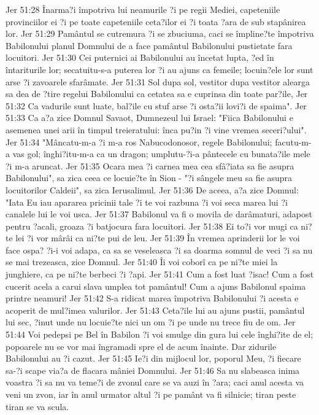 Jer 51:28  Înarma?i împotriva lui neamurile ?i pe regii Mediei, capeteniile provinciilor ei ?i pe toate capeteniile ceta?ilor ei ?i toata ?ara de sub stapânirea lor.
Jer 51:29  Pamântul se cutremura ?i se zbuciuma, caci se împline?te împotriva Babilonului planul Domnului de a face pamântul Babilonului pustietate fara locuitori.
Jer 51:30  Cei puternici ai Babilonului au încetat lupta, ?ed în întariturile lor; secatuitu-s-a puterea lor ?i au ajuns ca femeile; locuin?ele lor sunt arse ?i zavoarele sfarâmate.
Jer 51:31  Sol dupa sol, vestitor dupa vestitor alearga sa dea de ?tire regelui Babilonului ca cetatea sa e cuprinsa din toate par?ile,
Jer 51:32  Ca vadurile sunt luate, bal?ile cu stuf arse ?i osta?ii lovi?i de spaima".
Jer 51:33  Ca a?a zice Domnul Savaot, Dumnezeul lui Israel: "Fiica Babilonului e asemenea unei arii în timpul treieratului: înca pu?in ?i vine vremea seceri?ului".
Jer 51:34  "Mâncatu-m-a ?i m-a ros Nabucodonosor, regele Babilonului; facutu-m-a vas gol; înghi?itu-m-a ca un dragon; umplutu-?i-a pântecele cu bunata?ile mele ?i m-a aruncat.
Jer 51:35  Ocara mea ?i carnea mea cea sfâ?iata sa fie asupra Babilonului", sa zica ceea ce locuie?te în Sion - "?i sângele meu sa fie asupra locuitorilor Caldeii", sa zica Ierusalimul.
Jer 51:36  De aceea, a?a zice Domnul: "Iata Eu iau apararea pricinii tale ?i te voi razbuna ?i voi seca marea lui ?i canalele lui le voi usca.
Jer 51:37  Babilonul va fi o movila de darâmaturi, adapost pentru ?acali, groaza ?i batjocura fara locuitori.
Jer 51:38  Ei to?i vor mugi ca ni?te lei ?i vor mârâi ca ni?te pui de leu.
Jer 51:39  În vremea aprinderii lor le voi face ospa? ?i-i voi adapa, ca sa se veseleasca ?i sa doarma somnul de veci ?i sa nu se mai trezeasca, zice Domnul.
Jer 51:40  Îi voi coborî ca pe ni?te miei la junghiere, ca pe ni?te berbeci ?i ?api.
Jer 51:41  Cum a fost luat ?isac! Cum a fost cucerit acela a carui slava umplea tot pamântul! Cum a ajuns Babilonul spaima printre neamuri!
Jer 51:42  S-a ridicat marea împotriva Babilonului ?i acesta e acoperit de mul?imea valurilor.
Jer 51:43  Ceta?ile lui au ajuns pustii, pamântul lui sec, ?inut unde nu locuie?te nici un om ?i pe unde nu trece fiu de om.
Jer 51:44  Voi pedepsi pe Bel în Babilon ?i voi smulge din gura lui cele înghi?ite de el; popoarele nu se vor mai îngramadi spre el de acum înainte. Dar zidurile Babilonului au ?i cazut.
Jer 51:45  Ie?i din mijlocul lor, poporul Meu, ?i fiecare sa-?i scape via?a de flacara mâniei Domnului.
Jer 51:46  Sa nu slabeasca inima voastra ?i sa nu va teme?i de zvonul care se va auzi în ?ara; caci anul acesta va veni un zvon, iar în anul urmator altul ?i pe pamânt va fi silnicie; tiran peste tiran se va scula.

